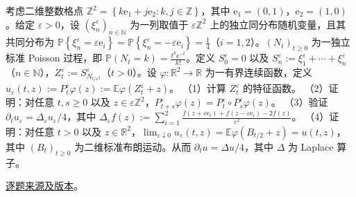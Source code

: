 \documentclass[UTF8,12pt,a4paper,fontset=fandol]{ctexbook}
\begin{document}
\begin{example}[公开题解转录]\label{q:fin15-high:12}

考虑二维整数格点 $\mathbb{Z}^{2} = \left\{k\mathrm{e}_{1} + j\mathrm{e}_{2} : k,j \in \mathbb{Z}\right\}$，其中 $\mathrm{e}_{1} = (0,1)$，$\mathrm{e}_{2} = (1,0)$。给定 $\varepsilon > 0$，设 $\left(\xi_{n}^{\varepsilon}\right)_{n \in \mathbb{N}}$ 为一列取值于 $\varepsilon\mathbb{Z}^{2}$ 上的独立同分布随机变量，且其共同分布为 $\mathbb{P}\left\{\xi_{n}^{\varepsilon} = \varepsilon\mathrm{e}_{i}\right\} = \mathbb{P}\left\{\xi_{n}^{\varepsilon} = -\varepsilon\mathrm{e}_{i}\right\} = \frac{1}{4}$（$i = 1,2$）。$\left(N_{t}\right)_{t \geq 0}$ 为一独立标准 Poisson 过程，即 $\mathbb{P}\left(N_{t} = k\right) = \frac{t^{k}\mathrm{e}^{-t}}{k!}$。定义 $S_{0}^{\varepsilon} = 0$ 以及 $S_{n}^{\varepsilon} := \xi_{1}^{\varepsilon} + \cdots + \xi_{n}^{\varepsilon}$（$n \in \mathbb{N}$），$Z_{t}^{\varepsilon} := S_{N_{t/\varepsilon^{2}}}^{\varepsilon}$（$t > 0$）。设 $\varphi: \mathbb{R}^{2} \rightarrow \mathbb{R}$ 为一有界连续函数，定义 $u_{\varepsilon}(t,z) := P_{t}^{\varepsilon}\varphi(z) := \mathbb{E}\varphi\left(Z_{t}^{\varepsilon} + z\right)$。
（1）计算 $Z_{t}^{\varepsilon}$ 的特征函数。
（2）证明：对任意 $t,s \geq 0$ 以及 $z \in \varepsilon\mathbb{Z}^{2}$，$P_{t+s}^{\varepsilon}\varphi(z) = P_{t}^{\varepsilon} \circ P_{s}^{\varepsilon}\varphi(z)$。
（3）验证 $\partial_{t}u_{\varepsilon} = \Delta_{\varepsilon}u_{\varepsilon}/4$，其中 $\Delta_{\varepsilon}f(z) := \sum_{i=1}^{2}\frac{f\left(z + \varepsilon\mathrm{e}_{i}\right) + f\left(z - \varepsilon\mathrm{e}_{i}\right) - 2f(z)}{\varepsilon^{2}}$。
（4）证明：对任意 $t > 0$ 以及 $z \in \mathbb{R}^2$，$\lim_{\varepsilon \downarrow 0}u_{\varepsilon}(t,z) = \mathbb{E}\varphi\left(B_{t/2} + z\right) = u(t,z)$，其中 $\left(B_{t}\right)_{t \geq 0}$ 为二维标准布朗运动。从而 $\partial_{t}u = \Delta u/4$，其中 $\Delta$ 为 Laplace 算子。

\end{example}

\href{https://github.com/lzxcr/cmc-mathematics/blob/64916fa1fdbc3e444a652eca204d5669058ee321/src/problems/finals/15/15.md}{逐题来源及版本}。
\end{document}
